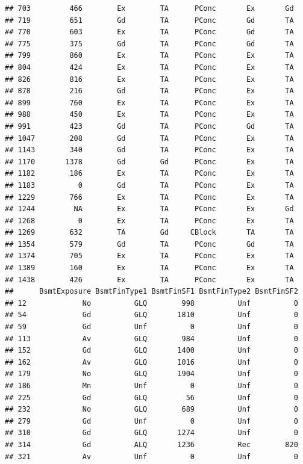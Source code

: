 \documentclass[]{article}
\begin{document}
\begin{verbatim}
## 703         466        Ex        TA      PConc       Ex       Gd
## 719         651        Gd        TA      PConc       Gd       TA
## 770         603        Ex        TA      PConc       Gd       TA
## 775         375        Gd        TA      PConc       Gd       TA
## 799         860        Ex        TA      PConc       Ex       TA
## 804         424        Ex        TA      PConc       Ex       TA
## 826         816        Ex        TA      PConc       Ex       TA
## 878         216        Gd        TA      PConc       Ex       TA
## 899         760        Ex        TA      PConc       Ex       TA
## 988         450        Ex        TA      PConc       Ex       TA
## 991         423        Gd        TA      PConc       Gd       TA
## 1047        208        Gd        TA      PConc       Ex       TA
## 1143        340        Gd        TA      PConc       Ex       TA
## 1170       1378        Gd        Gd      PConc       Ex       TA
## 1182        186        Ex        TA      PConc       Ex       TA
## 1183          0        Gd        TA      PConc       Ex       TA
## 1229        766        Ex        TA      PConc       Ex       TA
## 1244         NA        Ex        TA      PConc       Ex       Gd
## 1268          0        Ex        TA      PConc       Ex       TA
## 1269        632        TA        Gd     CBlock       TA       TA
## 1354        579        Gd        TA      PConc       Gd       TA
## 1374        705        Ex        TA      PConc       Ex       TA
## 1389        160        Ex        TA      PConc       Ex       TA
## 1438        426        Ex        TA      PConc       Ex       TA
##      BsmtExposure BsmtFinType1 BsmtFinSF1 BsmtFinType2 BsmtFinSF2
## 12             No          GLQ        998          Unf          0
## 54             Gd          GLQ       1810          Unf          0
## 59             Gd          Unf          0          Unf          0
## 113            Av          GLQ        984          Unf          0
## 152            Gd          GLQ       1400          Unf          0
## 162            Av          GLQ       1016          Unf          0
## 179            No          GLQ       1904          Unf          0
## 186            Mn          Unf          0          Unf          0
## 225            Gd          GLQ         56          Unf          0
## 232            No          GLQ        689          Unf          0
## 279            Gd          Unf          0          Unf          0
## 310            Gd          GLQ       1274          Unf          0
## 314            Gd          ALQ       1236          Rec        820
## 321            Av          Unf          0          Unf          0

\end{verbatim}
\end{document}
